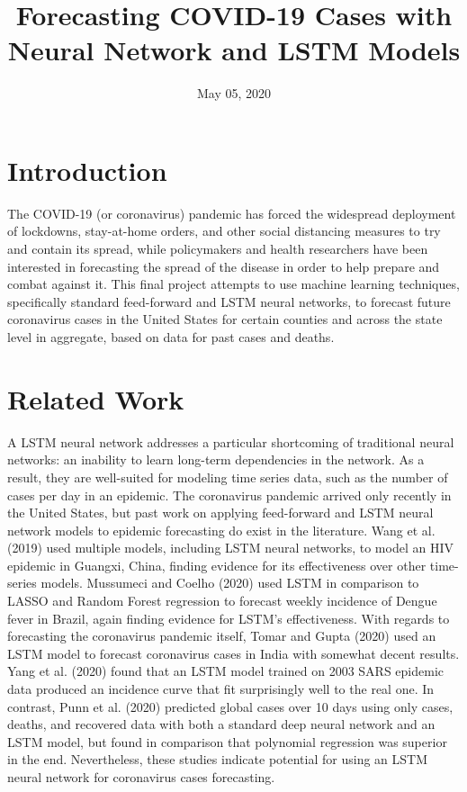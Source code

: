 ﻿\documentclass{article}
\title{Forecasting COVID-19 Cases with Neural Network and LSTM Models}
\author{}
\date{May 05, 2020}
\begin{document}
\maketitle
\newpage

\section*{Introduction}

The COVID-19 (or coronavirus) pandemic has forced the widespread deployment of
lockdowns, stay-at-home orders, and other social distancing measures to try and
contain its spread, while policymakers and health researchers have been
interested in forecasting the spread of the disease in order to help prepare and
combat against it. This final project attempts to use machine learning
techniques, specifically standard feed-forward and LSTM neural networks, to
forecast future coronavirus cases in the United States for certain counties and
across the state level in aggregate, based on data for past cases and deaths.


\section*{Related Work}


A LSTM neural network addresses a particular shortcoming of traditional neural
networks: an inability to learn long-term dependencies in the network. As a
result, they are well-suited for modeling time series data, such as the number
of cases per day in an epidemic. The coronavirus pandemic arrived only recently
in the United States, but past work on applying feed-forward and LSTM neural
network models to epidemic forecasting do exist in the literature. Wang et al.
(2019) used multiple models, including LSTM neural networks, to model an HIV
epidemic in Guangxi, China, finding evidence for its effectiveness over other
time-series models. Mussumeci and Coelho (2020) used LSTM in comparison to LASSO
and Random Forest regression to forecast weekly incidence of Dengue fever in
Brazil, again finding evidence for LSTM’s effectiveness. With regards to
forecasting the coronavirus pandemic itself, Tomar and Gupta (2020) used an LSTM
model to forecast coronavirus cases in India with somewhat decent results. Yang
et al. (2020) found that an LSTM model trained on 2003 SARS epidemic data
produced an incidence curve that fit surprisingly well to the real one. In
contrast, Punn et al. (2020) predicted global cases over 10 days using only
cases, deaths, and recovered data with both a standard deep neural network and
an LSTM model, but found in comparison that polynomial regression was superior
in the end. Nevertheless, these studies indicate potential for using an LSTM
neural network for coronavirus cases forecasting.\\
\end{document}
